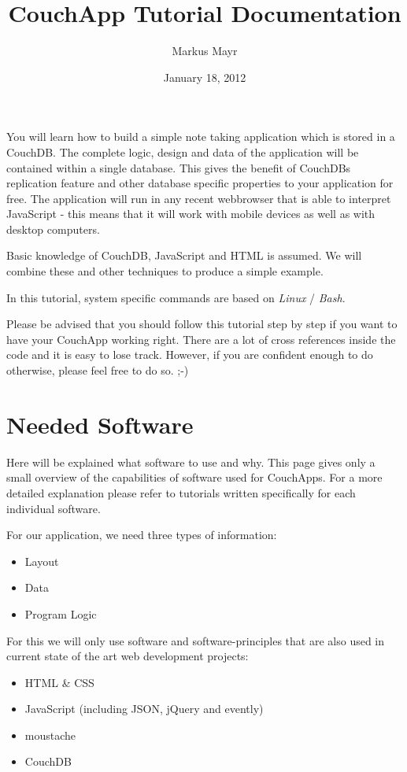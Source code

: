 \documentclass[letterpaper,10pt,english]{sphinxmanual}
\title{CouchApp Tutorial Documentation}
\date{January 18, 2012}
\author{Markus Mayr}
\begin{document}
\maketitle
\tableofcontents
{}\label{index::doc}


You will learn how to build a simple note taking application which is stored in a CouchDB. The complete logic, design and data of the application will be contained within a single database. This gives the benefit of CouchDBs replication feature and other database specific properties to your application for free.
The application will run in any recent webbrowser that is able to interpret JavaScript - this means that it will work with mobile devices as well as with desktop computers.

Basic knowledge of CouchDB, JavaScript and HTML is assumed. We will combine these and other techniques to produce a simple example.

In this tutorial, system specific commands are based on \emph{Linux} / \emph{Bash}.

Please be advised that you should follow this tutorial step by step if you want to have your CouchApp working right. There are a lot of cross references inside the code and it is easy to lose track. However, if you are confident enough to do otherwise, please feel free to do so. ;-)


\chapter{Needed Software}
\label{1-UsedSoftware:needed-software}\label{1-UsedSoftware::doc}\label{1-UsedSoftware:welcome-to-the-couchapp-tutorial}
Here will be explained what software to use and why. This page gives only a small overview of the capabilities of software used for CouchApps. For a more detailed explanation please refer to tutorials written specifically for each individual software.

For our application, we need three types of information:
\begin{itemize}
\item {} 
Layout

\item {} 
Data

\item {} 
Program Logic

\end{itemize}

For this we will only use software and software-principles that are also used in current state of the art web development projects:
\begin{itemize}
\item {} 
HTML \& CSS

\item {} 
JavaScript (including JSON, jQuery and evently)

\item {} 
moustache

\item {} 
CouchDB

\end{itemize}
\end{document}
